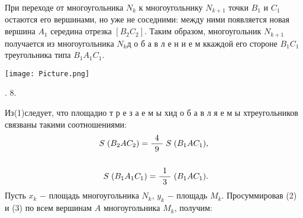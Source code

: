 \begin{minipage}[t]{0.48\linewidth}
При переходе от многоугольника $N_k$ к многоугольнику $N_{k + 1}$ точки $B_1$ и $C_1$ остаются его вершинами, но уже не соседними: между ними появляется новая вершина $A_1$ середина отрезка $[B_2C_2]$. Таким образом, многоугольник $N_{k + 1}$ получается из многоугольника $N_k$\hspace{3mm}д о б а в л е н и е м к\hspace{3mm}каждой его стороне $B_1C_1$ треугольника типа $B_1A_1C_1$.
\medskip

\noindent\texttt{[image: Picture.png]}

. 8.
\end{minipage}\quad
\begin{minipage}[t]{0.45\linewidth}

Из\hspace{2.5mm}(1)\hspace{2.5mm}следует, что площади\hspace{5mm}о т р е з а е м ы х\hspace{5mm}и\hspace{5mm}д о б а в л я е м ы х\hspace{5mm}треугольников связваны такими соотношениями:
\begin{align}
    S\hspace{1mm}(B_2AC_2) = \frac{\hspace{1.5mm}4\hspace{1.5mm}}{9}\hspace{1mm}S\hspace{1mm}(B_1AC_1), \\
    \nonumber\\
    S\hspace{1mm}(B_1A_1C_1) = \frac{\hspace{1.5mm}1\hspace{1.5mm}}{3}\hspace{1mm}(B_1AC_1).
\end{align}
Пусть $x_k$ \hspace{0.5mm}$-$ \hspace{0.5mm}площадь многоугольника $N_k$, $y_k$ \hspace{0.5mm}$-$ \hspace{0.5mm}площадь \hspace{0.5mm}$M_k$. Просуммировав (2) и (3) по всем вершинам \hspace{0.5mm}$A$ \hspace{0.5mm}многоугольника \hspace{1.5mm}$M_k$, получим:
\begin{align}

\end{align}
\end{minipage}
